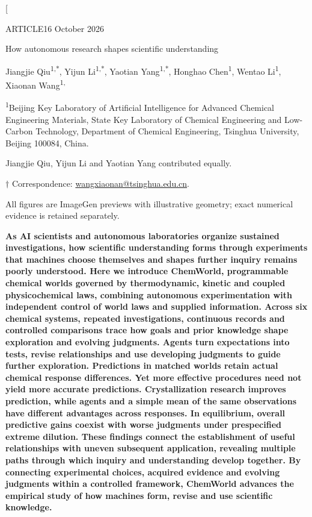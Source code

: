 \documentclass[10pt,a4paper]{article}
\begin{document}
\twocolumn[

{\sffamily\small ARTICLE\hfill 16 October 2026\par}
\vspace{8pt}
{\sffamily\LARGE\bfseries\raggedright{} How autonomous research shapes scientific understanding\par}
\vspace{8pt}
{\normalsize Jiangjie Qiu\textsuperscript{1,*}, Yijun Li\textsuperscript{1,*}, Yaotian Yang\textsuperscript{1,*}, Honghao Chen\textsuperscript{1}, Wentao Li\textsuperscript{1}, Xiaonan Wang\textsuperscript{1,\textdagger}\par}
{\footnotesize\textsuperscript{1}Beijing Key Laboratory of Artificial Intelligence for Advanced Chemical Engineering Materials, State Key Laboratory of Chemical Engineering and Low-Carbon Technology, Department of Chemical Engineering, Tsinghua University, Beijing 100084, China.\par}
{\footnotesize * Jiangjie Qiu, Yijun Li and Yaotian Yang contributed equally.\par}
{\footnotesize $\dagger$ Correspondence: \href{mailto:wangxiaonan@tsinghua.edu.cn}{wangxiaonan@tsinghua.edu.cn}.\par}
\vspace{6pt}
{\sffamily\footnotesize All figures are ImageGen previews with illustrative geometry; exact numerical evidence is retained separately.\par}
\vspace{8pt}

\textbf{As AI scientists and autonomous laboratories organize sustained investigations, how scientific understanding forms through experiments that machines choose themselves and shapes further inquiry remains poorly understood. Here we introduce ChemWorld, programmable chemical worlds governed by thermodynamic, kinetic and coupled physicochemical laws, combining autonomous experimentation with independent control of world laws and supplied information. Across six chemical systems, repeated investigations, continuous records and controlled comparisons trace how goals and prior knowledge shape exploration and evolving judgments. Agents turn expectations into tests, revise relationships and use developing judgments to guide further exploration. Predictions in matched worlds retain actual chemical response differences. Yet more effective procedures need not yield more accurate predictions. Crystallization research improves prediction, while agents and a simple mean of the same observations have different advantages across responses. In equilibrium, overall predictive gains coexist with worse judgments under prespecified extreme dilution. These findings connect the establishment of useful relationships with uneven subsequent application, revealing multiple paths through which inquiry and understanding develop together. By connecting experimental choices, acquired evidence and evolving judgments within a controlled framework, ChemWorld advances the empirical study of how machines form, revise and use scientific knowledge.}
\end{document}
